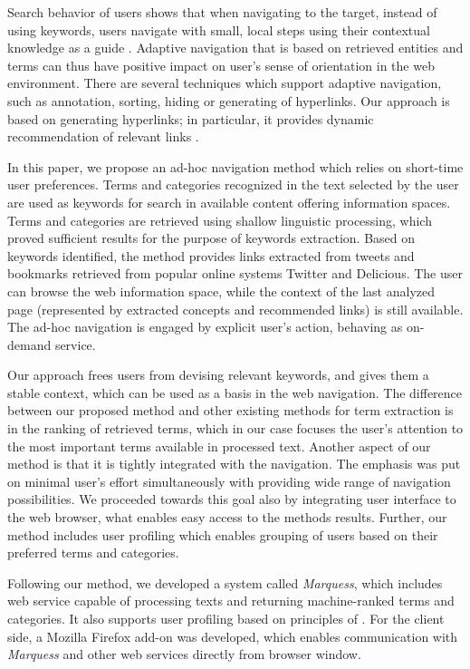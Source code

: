 \documentclass{llncs}%
\begin{document}
Search behavior of users shows that when navigating to the target, instead of using keywords, users navigate with small, local steps using their contextual knowledge as a guide \cite{teevan2004perfect}. Adaptive navigation that is based on retrieved entities and terms can thus have positive impact on user's sense of orientation in the web environment. There are several techniques which support adaptive navigation, such as annotation, sorting, hiding or generating of hyperlinks. Our approach is based on generating hyperlinks; in particular, it provides dynamic recommendation of relevant links \cite{brusilovsky2002adaptive}. 

In this paper, we propose an ad-hoc navigation method which relies on short-time user preferences. Terms and categories recognized in the text selected by the user are used as keywords for search in available content offering information spaces. Terms and categories are retrieved using shallow linguistic processing, which proved sufficient results for the purpose of keywords extraction. Based on keywords identified, the method provides links extracted from tweets and bookmarks retrieved from popular online systems Twitter and Delicious. The user can browse the web information space, while the context of the last analyzed page (represented by extracted concepts and recommended links) is still available. The ad-hoc navigation is engaged by explicit user’s action, behaving as on-demand service. 

Our approach frees users from devising relevant keywords, and gives them a stable context, which can be used as a basis in the web navigation. The difference between our proposed method and other existing methods for term extraction is in the ranking of retrieved terms, which in our case focuses the user’s attention to the most important terms available in processed text. Another aspect of our method is that it is tightly integrated with the navigation. The emphasis was put on minimal user’s effort simultaneously with providing wide range of navigation possibilities. We proceeded towards this goal also by integrating user interface to the web browser, what enables easy access to the methods results. Further, our method includes user profiling which enables grouping of users based on their preferred terms and categories. 

Following our method, we developed a system called \textit{Marquess}, which includes web service capable of processing texts and returning machine-ranked terms and categories. It also supports user profiling based on principles of \cite{pazzani2007content}. For the client side, a Mozilla Firefox add-on was developed, which enables communication with \textit{Marquess} and other web services directly from browser window. 
\end{document}
